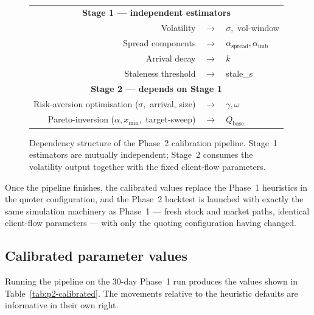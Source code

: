 \begin{figure}[ht]
\centering
\begin{tabular}{rcl}
\multicolumn{3}{c}{\textbf{Stage 1 --- independent estimators}} \\[3pt]
Volatility           & $\longrightarrow$ & $\sigma,$ vol-window \\
Spread components    & $\longrightarrow$ & $\alpha_{\text{spread}}, \alpha_{\text{imb}}$ \\
Arrival decay        & $\longrightarrow$ & $k$ \\
Staleness threshold  & $\longrightarrow$ & stale\_s \\[5pt]
\multicolumn{3}{c}{\textbf{Stage 2 --- depends on Stage 1}} \\[3pt]
Risk-aversion optimisation ($\sigma,$ arrival, size)  & $\longrightarrow$ & $\gamma, \omega$ \\
Pareto-inversion ($\alpha, x_{\min},$ target-sweep)   & $\longrightarrow$ & $Q_{\text{base}}$ \\
\end{tabular}
\caption{Dependency structure of the Phase~2 calibration pipeline.
Stage~1 estimators are mutually independent; Stage~2 consumes the
volatility output together with the fixed client-flow parameters.}
\label{fig:p2-deps}
\end{figure}

Once the pipeline finishes, the calibrated values replace the
Phase~1 heuristics in the quoter configuration, and the Phase~2
backtest is launched with exactly the same simulation machinery as
Phase~1 --- fresh stock and market paths, identical client-flow
parameters --- with only the quoting configuration having changed.

\subsection{Calibrated parameter values}

Running the pipeline on the 30-day Phase~1 run produces the values
shown in Table~\ref{tab:p2-calibrated}. The movements relative to the
heuristic defaults are informative in their own right.

